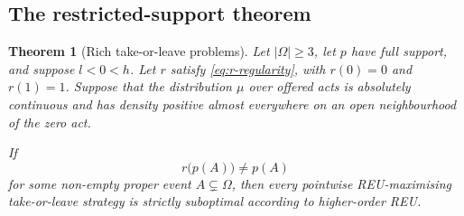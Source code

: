 \documentclass[11pt,a4paper]{article}
\newtheorem{theorem}{Theorem}[section]
\theoremstyle{definition}
\begin{document}
\subsection{The restricted-support theorem}

\begin{theorem}[Rich take-or-leave problems]\label{thm:take-or-leave}
Let $|\Omega|\geq3$, let $p$ have full support, and suppose $l<0<h$. Let $r$
satisfy \eqref{eq:r-regularity}, with $r(0)=0$ and $r(1)=1$. Suppose that the
distribution $\mu$ over offered acts is absolutely continuous and has density
positive almost everywhere on an open neighbourhood of the zero act.

If
\[
 r\bigl(p(A)\bigr)\neq p(A)
\]
for some non-empty proper event $A\subsetneq\Omega$, then every pointwise
REU-maximising take-or-leave strategy is strictly suboptimal according to
higher-order REU.
\end{theorem}
\end{document}
